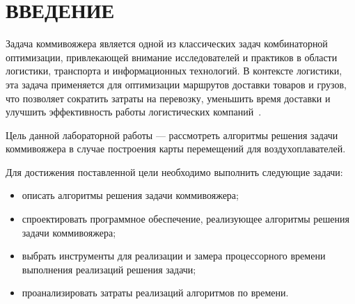 \chapter*{ВВЕДЕНИЕ}

Задача коммивояжера является одной из классических задач комбинаторной оптимизации, привлекающей внимание исследователей и практиков в области логистики, транспорта и информационных технологий.
В контексте логистики, эта задача применяется для оптимизации маршрутов доставки товаров и грузов, что позволяет сократить затраты на перевозку, уменьшить время доставки и улучшить эффективность работы логистических компаний~\cite{intro}.

Цель данной лабораторной работы --- рассмотреть алгоритмы решения задачи коммивояжера в случае построения карты перемещений для воздухоплавателей.

Для достижения поставленной цели необходимо выполнить следующие задачи:
\begin{itemize}
	\item описать алгоритмы решения задачи коммивояжера;
	\item спроектировать программное обеспечение, реализующее алгоритмы решения задачи коммивояжера;
	\item выбрать инструменты для реализации и замера процессорного времени
	выполнения реализаций решения задачи;
	\item проанализировать затраты реализаций алгоритмов по времени.
\end{itemize}

